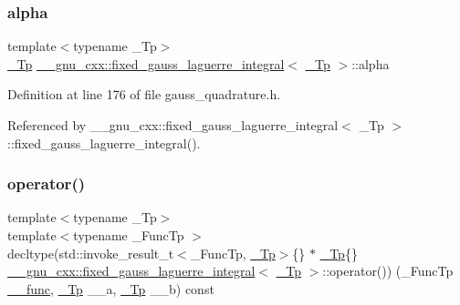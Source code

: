 \subsubsection{\texorpdfstring{alpha}{alpha}}
{\footnotesize\ttfamily template$<$typename \+\_\+\+Tp$>$ \\
\hyperlink{namespace____gnu__cxx_a3b19a9c800ca194374ef9172290f7d79}{\+\_\+\+Tp} \hyperlink{struct____gnu__cxx_1_1fixed__gauss__laguerre__integral}{\+\_\+\+\_\+gnu\+\_\+cxx\+::fixed\+\_\+gauss\+\_\+laguerre\+\_\+integral}$<$ \hyperlink{namespace____gnu__cxx_a3b19a9c800ca194374ef9172290f7d79}{\+\_\+\+Tp} $>$\+::alpha}



Definition at line 176 of file gauss\+\_\+quadrature.\+h.



Referenced by \+\_\+\+\_\+gnu\+\_\+cxx\+::fixed\+\_\+gauss\+\_\+laguerre\+\_\+integral$<$ \+\_\+\+Tp $>$\+::fixed\+\_\+gauss\+\_\+laguerre\+\_\+integral().

\mbox{\label{struct____gnu__cxx_1_1fixed__gauss__laguerre__integral_aa0fcf97f3a5d830227b787378d0db399}} 
\subsubsection{\texorpdfstring{operator()}{operator()}}
{\footnotesize\ttfamily template$<$typename \+\_\+\+Tp$>$ \\
template$<$typename \+\_\+\+Func\+Tp $>$ \\
decltype(std\+::invoke\+\_\+result\+\_\+t$<$\+\_\+\+Func\+Tp, \hyperlink{namespace____gnu__cxx_a3b19a9c800ca194374ef9172290f7d79}{\+\_\+\+Tp}$>$\{\} $\ast$ \hyperlink{namespace____gnu__cxx_a3b19a9c800ca194374ef9172290f7d79}{\+\_\+\+Tp}\{\} \hyperlink{struct____gnu__cxx_1_1fixed__gauss__laguerre__integral}{\+\_\+\+\_\+gnu\+\_\+cxx\+::fixed\+\_\+gauss\+\_\+laguerre\+\_\+integral}$<$ \hyperlink{namespace____gnu__cxx_a3b19a9c800ca194374ef9172290f7d79}{\+\_\+\+Tp} $>$\+::operator()) (\+\_\+\+Func\+Tp \hyperlink{namespace____gnu__cxx_af2b2f0c7a2ae72b922b1afefae5a65b2}{\+\_\+\+\_\+func}, \hyperlink{namespace____gnu__cxx_a3b19a9c800ca194374ef9172290f7d79}{\+\_\+\+Tp} \+\_\+\+\_\+a, \hyperlink{namespace____gnu__cxx_a3b19a9c800ca194374ef9172290f7d79}{\+\_\+\+Tp} \+\_\+\+\_\+b) const}



